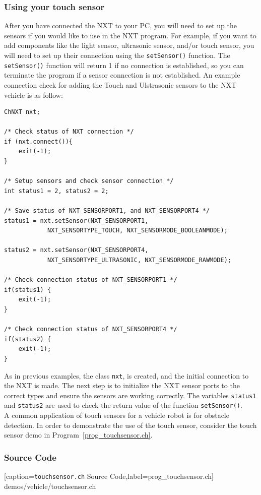 \documentclass[11pt]{article}
\begin{document}
\subsubsection{Using your touch sensor}
After you have connected the NXT to your PC, you will need to set up the sensors 
if you would like to use in the NXT program. For example, if you want to add 
components like the light sensor, ultrasonic sensor, and/or touch sensor, you 
will need to set up their connection using the {\tt setSensor()} function. The 
{\tt setSensor()} function will return 1 if no connection is established, so you 
can terminate the program if a sensor connection is not established. An example 
connection check for adding the Touch and Ulstrasonic sensors to the NXT vehicle 
is as follow:
\begin{lstlisting}
ChNXT nxt;

/* Check status of NXT connection */
if (nxt.connect()){
    exit(-1);
}

/* Setup sensors and check sensor connection */
int status1 = 2, status2 = 2;

/* Save status of NXT_SENSORPORT1, and NXT_SENSORPORT4 */
status1 = nxt.setSensor(NXT_SENSORPORT1, 
            NXT_SENSORTYPE_TOUCH, NXT_SENSORMODE_BOOLEANMODE);

status2 = nxt.setSensor(NXT_SENSORPORT4,
            NXT_SENSORTYPE_ULTRASONIC, NXT_SENSORMODE_RAWMODE);
    
/* Check connection status of NXT_SENSORPORT1 */
if(status1) {
    exit(-1);
}
    
/* Check connection status of NXT_SENSORPORT4 */
if(status2) {
    exit(-1);
}
\end{lstlisting}

As in previous examples, the class {\tt nxt}, is created, and the initial 
connection to the NXT is made. The next step is to initialize the NXT sensor 
ports to the correct types and ensure the sensors are working correctly. The 
variables {\tt status1} and {\tt status2} are used to check the return value 
of the function {\tt setSensor()}.\\

A common application of touch sensors for a vehicle robot is for obstacle 
detection. In order to demonstrate the use of the touch sensor, consider the 
touch sensor demo in Program~\ref{prog_touchsensor.ch}.
\subsubsection*{Source Code}

[caption={{\tt touchsensor.ch} Source Code},label=prog_touchsensor.ch]
{demos/vehicle/touchsensor.ch}
\end{document}
